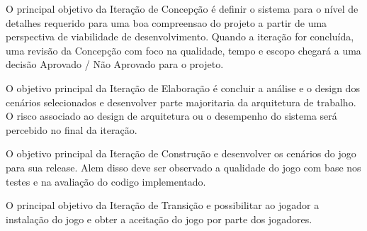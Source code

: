 O principal objetivo da Iteração de Concepção é definir o sistema para o nível de detalhes requerido para uma boa compreensao do projeto a partir de uma perspectiva de viabilidade de desenvolvimento. Quando a iteração for concluída, uma revisão da Concepção com foco na qualidade, tempo e escopo chegará a uma decisão Aprovado / Não Aprovado para o projeto.

O objetivo principal da Iteração de Elaboração é concluir a análise e o design dos cenários selecionados e desenvolver parte majoritaria da arquitetura de trabalho. O risco associado ao design de arquitetura ou o desempenho do sistema será percebido no final da iteração. 

O objetivo principal da Iteração de Construção e desenvolver os cenários do jogo para sua release. Alem disso deve ser observado a qualidade do jogo com base nos testes e na avaliação do codigo implementado.

O principal objetivo da Iteração de Transição e possibilitar ao jogador a instalação do jogo e obter a aceitação do jogo por parte dos jogadores.
